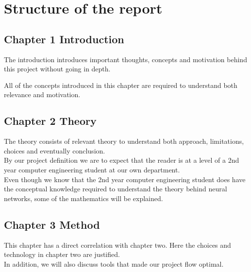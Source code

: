 \section{Structure of the report}
\subsection{Chapter 1 Introduction}
The introduction introduces important thoughts, concepts and motivation behind this project without going in depth.

All of the concepts introduced in this chapter are required to understand both relevance and motivation.

\subsection{Chapter 2 Theory}
The theory consists of relevant theory to understand both approach, limitations, choices and eventually conclusion.\\
By our project definition we are to expect that the reader is at a level of a 2nd year computer engineering student at our own department. \\
Even though we know that the 2nd year computer engineering student does have the conceptual knowledge required to understand the theory behind neural networks, some of the mathematics will be explained.

\subsection{Chapter 3 Method}
This chapter has a direct correlation with chapter two. Here the choices and technology in chapter two are justified.\\
In addition, we will also discuss tools that made our project flow optimal. \\


